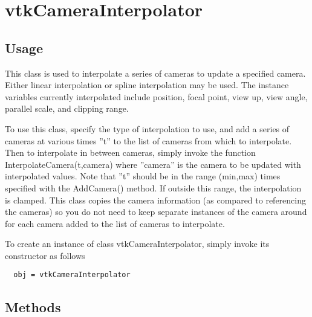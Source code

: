 \section{vtkCameraInterpolator}

\subsection{Usage}

 This class is used to interpolate a series of cameras to update a
 specified camera. Either linear interpolation or spline interpolation may
 be used. The instance variables currently interpolated include position,
 focal point, view up, view angle, parallel scale, and clipping range.

 To use this class, specify the type of interpolation to use, and add a
 series of cameras at various times ''t'' to the list of cameras from which to
 interpolate. Then to interpolate in between cameras, simply invoke the
 function InterpolateCamera(t,camera) where ''camera'' is the camera to be
 updated with interpolated values. Note that ''t'' should be in the range
 (min,max) times specified with the AddCamera() method. If outside this
 range, the interpolation is clamped. This class copies the camera information
 (as compared to referencing the cameras) so you do not need to keep separate
 instances of the camera around for each camera added to the list of cameras
 to interpolate.


To create an instance of class vtkCameraInterpolator, simply
invoke its constructor as follows
\begin{verbatim}
  obj = vtkCameraInterpolator
\end{verbatim}
\subsection{Methods}

